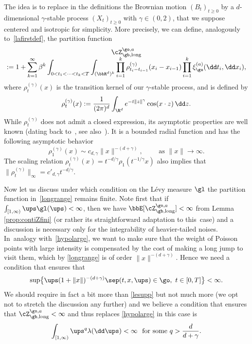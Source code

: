 The idea is to replace in the definitions the
Brownian motion $(B_t)_{t\geq 0}$
by a $d$\nobreakdash-dimen\-sional $\gamma$-stable process $(X_t)_{t\geq 0}$ with $\gamma\in (0,2)$, that we suppose centered and isotropic for simplicity. More precisely, we can define, analogously to~\eqref{lafirstdef}, the partition function\vspace*{-5pt}
\begin{multline}
\label{longrange}
\cZ_{\gb,\mathrm{long}}^{\go,a}\\[-5pt]
:= 1+\sum_{k=1}^\infty \beta^k\int_{0<t_1<\dots<t_k<T}\int_{(\bbR^d)^k} \prod_{i=1}^k \rho^{(\gamma)}_{t_i-t_{i-1}} (x_i-x_{i-1}) \prod_{i=1}^k \xi_{\go}^{(a)} (\dd t_i, \dd x_i),
\end{multline}
where $\rho_{t}^{(\gamma)}(x)$ is the transition kernel
of our $\gamma$-stable process, and is defined by
\[
\rho_t^{(\gamma)}(x) := \frac{1}{(2\pi)^d} \int_{\R^d} e^{-t \|z\|^{\gamma}} \cos(x \cdot z) \,\dd z.
\]
While $\rho_t^{(\gamma)}$ does not admit a closed expression, its asymptotic properties are well known (dating back to~\cite{K70}, see also~\cite[Ch.\,2]{ST94}).
It is a bounded radial function and has
the following asymptotic behavior
\begin{equation}\label{thetail}
\rho_1^{(\gamma)} (x) \sim c_{d,\gamma} \|x\|^{-(d+\gamma)},
\qquad \text{ as }
\| x\|\to \infty.
\end{equation}
The scaling relation
$\rho_{t}^{(\gamma)}(x) = t^{-d/\gamma} \rho_1(t^{-1/\gamma} x)$
also implies that $\|\rho_{t}^{(\gamma)} \|_{\infty}= c'_{d,\gamma} t^{-d/\gamma}.$

Now let us discuss under which condition on the Lévy measure $\gl$ the partition function in~\eqref{longrange} remains finite. Note first that if $\int_{[1,\infty)} \ups \gl(\ups)<\infty$, then we have $\bbE [ \cZ_{\gb,\mathrm{long}}^{\go,a} ]<\infty$ from Lemma \ref{prop:contiZfini} (or rather its straightforward adaptation to this~case) and a discussion is necessary only for the integrability of heavier-tailed noises.
In~analogy with~\eqref{hypolarge}, we want to make sure that
the weight of Poisson points with large intensity is compensated by the cost of making a long jump to visit them, which by \eqref{longrange} is of order
$\|x\|^{-(d+\gamma)}$. Hence we need a condition that ensures that
\begin{equation}\label{lesupp}
\sup \bigl\{ \ups (1+ \|x\|)^{-(d+\gamma)} \sep (t,x,\ups) \in \go, \ t\in[0,T] \bigr\} <\infty.
\end{equation}
We should require in fact a bit more than \eqref{lesupp} but not much more (we opt not to stretch the discussion any further) and we believe
a condition that ensures that $\cZ_{\gb,\mathrm{long}}^{\go,a}<\infty$ and thus replaces \eqref{hypolarge} in this case is
\begin{equation}
\label{hypolargelongrange}
\int_{[1,\infty)} \ups^{q} \lambda(\dd \ups) <\infty
\ \text{ for some } q> \frac{d}{d+\gamma}.
\end{equation}

